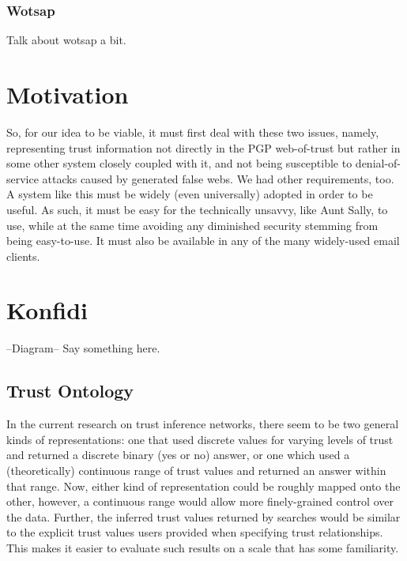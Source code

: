 \documentclass[onecolumn]{acm_proc_article-sp}
\begin{document}
\subsubsection{Wotsap}
\label{wotsap}
Talk about wotsap a bit.

\section{Motivation}
So, for our idea to be viable, it must first deal with these two issues, namely, representing trust information not directly in the PGP web-of-trust but rather in some other system closely coupled with it, and not being susceptible to denial-of-service attacks caused by generated false webs. We had other requirements, too. A system like this must be widely (even universally) adopted in order to be useful. As such, it must be easy for the technically unsavvy, like Aunt Sally, to use, while at the same time avoiding any diminished security stemming from being easy-to-use. It must also be available in any of the many widely-used email clients. 

\section{Konfidi}
--Diagram--
Say something here.

\subsection{Trust Ontology}
In the current research on trust inference networks, there seem to be two general kinds of representations:  one that used discrete values for varying levels of trust and returned a discrete binary (yes or no) answer, or one which used a (theoretically) continuous range of trust values and returned an answer within that range.  Now, either kind of representation could be roughly mapped onto the other, however, a continuous range would allow more finely-grained control over the data.  Further, the inferred trust values returned by searches would be similar to the explicit trust values users provided when specifying trust relationships.  This makes it easier to evaluate such results on a scale that has some familiarity.
\end{document}
